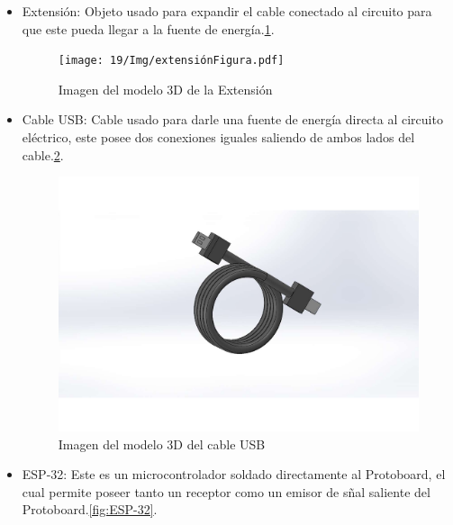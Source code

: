 \begin{itemize}
\begin{itemize}
    \item Extensión: Objeto usado para expandir el cable conectado al circuito para que este pueda llegar a la fuente de energía.\ref{fig:Extension}.
    
            \begin{figure}[H]
        \centering
        \texttt{[image: 19/Img/extensiónFigura.pdf]}
        \caption{Imagen del modelo 3D de la Extensión}
        \label{fig:Extension}
    \end{figure}
    
    \item Cable USB: Cable usado para darle una fuente de energía directa al circuito eléctrico, este posee dos conexiones iguales saliendo de ambos lados del cable.\ref{fig:CableUSB}.
    
            \begin{figure}[H]
        \centering
        \includegraphics[trim = {65mm 40mm 60mm 40mm},clip,scale=0.5]{19/Img/cableUSBFigura.pdf}
        \caption{Imagen del modelo 3D del cable USB}
        \label{fig:CableUSB}
    \end{figure}
    
    \item ESP-32: Este es un microcontrolador soldado directamente al Protoboard, el cual permite poseer tanto un receptor como un emisor de sñal saliente del Protoboard.\ref{fig:ESP-32}.
    

\end{itemize}
\end{itemize}
